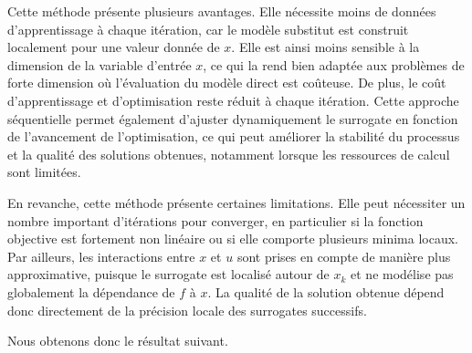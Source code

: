 \documentclass[a4paper, 11pt]{article}
\begin{document}
\vspace{0.5em}

Cette méthode présente plusieurs avantages. Elle nécessite moins de données d’apprentissage à chaque itération, car le modèle substitut est construit localement pour une valeur donnée de $x$. Elle est ainsi moins sensible à la dimension de la variable d’entrée $x$, ce qui la rend bien adaptée aux problèmes de forte dimension où l’évaluation du modèle direct est coûteuse. De plus, le coût d’apprentissage et d’optimisation reste réduit à chaque itération. Cette approche séquentielle permet également d’ajuster dynamiquement le surrogate en fonction de l’avancement de l’optimisation, ce qui peut améliorer la stabilité du processus et la qualité des solutions obtenues, notamment lorsque les ressources de calcul sont limitées.

\vspace{0.5em}

En revanche, cette méthode présente certaines limitations. Elle peut nécessiter un nombre important d’itérations pour converger, en particulier si la fonction objective est fortement non linéaire ou si elle comporte plusieurs minima locaux. Par ailleurs, les interactions entre $x$ et $u$ sont prises en compte de manière plus approximative, puisque le surrogate est localisé autour de $x_k$ et ne modélise pas globalement la dépendance de $f$ à $x$. La qualité de la solution obtenue dépend donc directement de la précision locale des surrogates successifs. 

Nous obtenons donc le résultat suivant.
\end{document}
